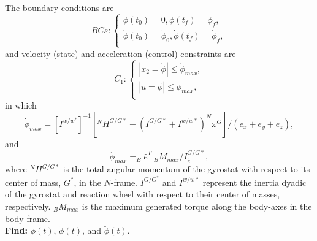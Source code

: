 \documentclass[letterpaper, preprint, paper,11pt]{AAS}	%
\begin{document}
			The boundary conditions are
			\begin{equation}\label{Bcs}
				BCs:\left\{
				\begin{array}{l}
				\phi(t_0)=0, \phi(t_f)=\phi_{f},\\
				\dot{\phi}(t_0)=\dot{\phi}_{0},\dot{ \phi}(t_f)=\dot{\phi}_{f}, \\
				\end{array}
				\right.
			\end{equation}
			and velocity (state) and acceleration (control) constraints are
			\begin{equation}\label{constraints1}
				C_1:\left\{
				\begin{array}{l}
				|x_2=\dot{\phi}|\leq \dot{\phi}_{max},\\
				|u=\ddot{\phi}|\leq \ddot{\phi}_{max},\\
				\end{array}
				\right.
			\end{equation}
			in which
			\begin{equation}
				\dot{\phi}_{max}=[I^{w/w^*}]^{-1}[^NH^{G/G*}-(I^{G/G*}+I^{w/w*})^N\omega^G]/(e_x+e_y+e_z),
			\end{equation}
			and
			\begin{equation}\label{phiddotmax}
				\ddot{\phi}_{max}=_B\hat{e}^T\  _BM_{max}/I_{\hat{e}}^{G/G*},
			\end{equation}
			where $^NH^{G/G*}$ is the total angular momentum of the gyrostat with respect to its center of mass, $G^*$, in the $N$-frame. $I^{G/G^*}$ and $I^{w/w*}$ represent the inertia dyadic of the gyrostat and reaction wheel with respect to their center of masses, respectively. $_BM_{max}$ is the maximum generated torque along the body-axes in the body frame. \\
			
			{\bf Find:} $\phi(t)$, $\dot{\phi}(t)$, and $\ddot{\phi}(t)$.
			
\end{document}
